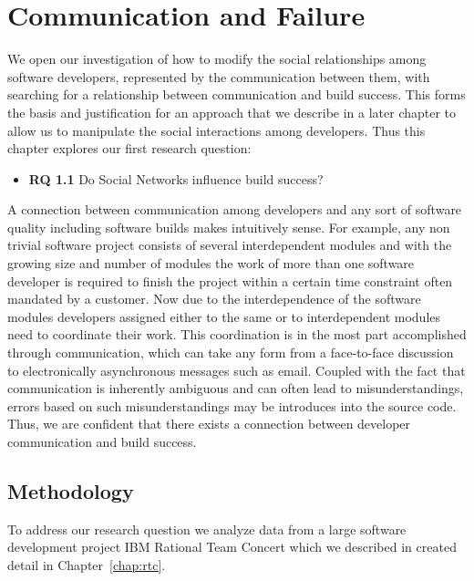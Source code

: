 \section{Communication and Failure}
\label{chap:soc-net}
We open our investigation of how to modify the social relationships among software developers, represented by the communication between them, with searching for a relationship between communication and build success.
This forms the basis and justification for an approach that we describe in a later chapter to allow us to manipulate the social interactions among developers.
Thus this chapter explores our first research question:
\begin{itemize}
\item\textbf{RQ 1.1} Do Social Networks influence build success?
\end{itemize}

A connection between communication among developers and any sort of software quality including software builds makes intuitively sense.
For example, any non trivial software project consists of several interdependent modules and with the growing size and number of modules the work of more than one software developer is required to finish the project within a certain time constraint often mandated by a customer.
Now due to the interdependence of the software modules developers assigned either to the same or to interdependent modules need to coordinate their work.
This coordination is in the most part accomplished through communication, which can take any form from a face-to-face discussion to electronically asynchronous messages such as email.
Coupled with the fact that communication is inherently ambiguous and can often lead to misunderstandings, errors based on such misunderstandings may be introduces into the source code.
Thus, we are confident that there exists  a connection between developer communication and build success.



\subsection{Methodology}
\label{sec:Methodology}
To address our research question we analyze data from a large software
development project IBM Rational Team Concert which we described in created detail in Chapter~\ref{chap:rtc}.

